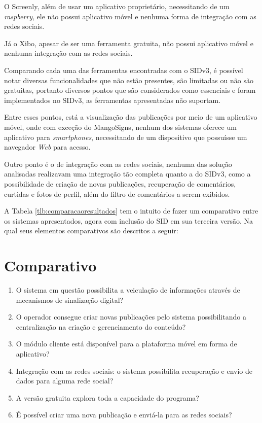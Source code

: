 O Screenly, além de usar um aplicativo proprietário, necessitando de um \textit{raspberry}, ele não possui aplicativo móvel e nenhuma forma de integração com as redes sociais.

Já o Xibo, apesar de ser uma ferramenta gratuita, não possui aplicativo móvel e nenhuma integração com as redes sociais. 

Comparando cada uma das ferramentas encontradas com o SIDv3, é possível notar diversas funcionalidades que não estão presentes, são limitadas ou não são gratuitas, portanto diversos pontos que são considerados como essenciais e foram implementados no SIDv3, as ferramentas apresentadas não suportam.

Entre esses pontos, está a visualização das publicações por meio de um aplicativo móvel, onde com exceção do MangoSigns, nenhum dos sistemas oferece um aplicativo para \textit{smartphones}, necessitando de um dispositivo que possuísse um navegador \textit{Web} para acesso.

Outro ponto é o de integração com as redes sociais, nenhuma das solução analisadas realizavam uma integração tão completa quanto a do SIDv3, como a possibilidade de criação de novas publicações, recuperação de comentários, curtidas e fotos de perfil, além do filtro de comentários a serem exibidos. 

A Tabela \ref{tlb:comparacaoresultados} tem o intuito de fazer um comparativo entre os sistemas apresentados, agora com inclusão do SID em sua terceira versão. Na qual seus elementos comparativos são descritos a seguir:
\section{Comparativo}
\begin{enumerate}[label=\Roman*)]
\label{tlb:comparacaoresultados}
    \item O sistema em questão possibilita a veiculação de informações através de mecanismos de sinalização digital?
	\item O operador consegue criar novas publicações pelo sistema possibilitando a centralização na criação e gerenciamento do conteúdo? 
	\item O módulo cliente está disponível para a plataforma móvel em forma de aplicativo?
	\item Integração com as redes sociais: o sistema possibilita recuperação e envio de dados para alguma rede social?
	\item A versão gratuita explora toda a capacidade do programa?
	\item É possível criar uma nova publicação e enviá-la para as redes sociais?
\end{enumerate}

